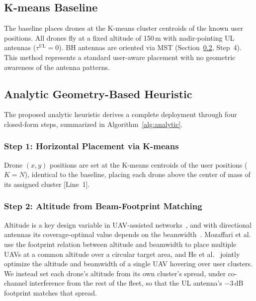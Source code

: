 \documentclass[conference]{IEEEtran}
\begin{document}

\subsection{K-means Baseline}

The baseline places drones at the K-means cluster centroids of the known user positions.
All drones fly at a fixed altitude of 150\,m with nadir-pointing UL antennas ($\tau^{\mathrm{UL}} = 0$).
BH antennas are oriented via MST (Section~\ref{sec:analytic}, Step~4).
This method represents a standard user-aware placement with no geometric awareness of the antenna patterns.

\subsection{Analytic Geometry-Based Heuristic}
\label{sec:analytic}

The proposed analytic heuristic derives a complete deployment through four closed-form steps, summarized in Algorithm~\ref{alg:analytic}.

\subsubsection{Step 1: Horizontal Placement via K-means}
Drone $(x, y)$ positions are set at the K-means centroids of the user positions ($K{=}N$), identical to the baseline, placing each drone above the center of mass of its assigned cluster [Line~1].

\subsubsection{Step 2: Altitude from Beam-Footprint Matching}
\label{sec:altitude}

Altitude is a key design variable in UAV-assisted networks~\cite{zhou2019}, and with directional antennas its coverage-optimal value depends on the beamwidth~\cite{galkin2017}. Mozaffari et al.~\cite{mozaffari2016} use the footprint relation between altitude and beamwidth to place multiple UAVs at a common altitude over a circular target area, and He et al.~\cite{he2018beamwidth} jointly optimize the altitude and beamwidth of a single UAV hovering over user clusters. We instead set each drone's altitude from its own cluster's spread, under co-channel interference from the rest of the fleet, so that the UL antenna's $-3$\,dB footprint matches that spread.
\end{document}
